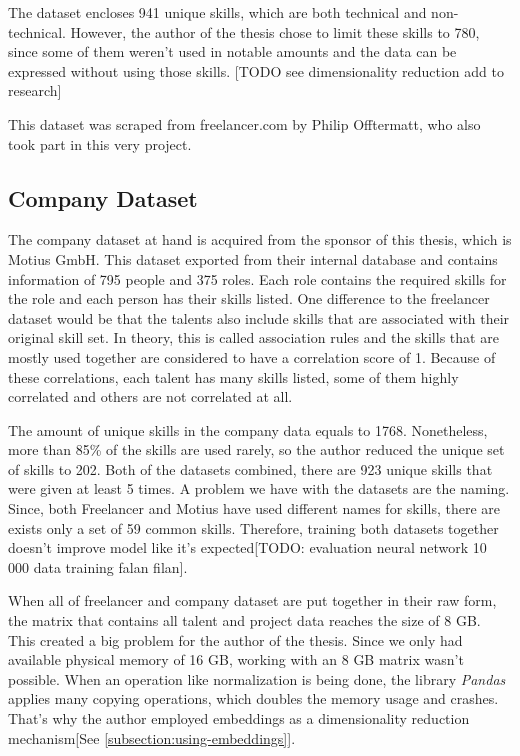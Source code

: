 The dataset encloses  941 unique skills, which are both technical and non-technical. However, the author of the thesis chose to limit these skills to 780, since some of them weren't used in notable amounts and the data can be expressed without using those skills. [TODO see dimensionality reduction add to research]


This dataset was scraped from freelancer.com by Philip Offtermatt, who also took part in this very project.


\subsection{Company Dataset}\label{subsection:company-dataset}

The company dataset at hand is acquired from the sponsor of this thesis, which is Motius GmbH. This dataset exported from their internal database and contains information of 795 people and 375 roles. Each role contains the required skills for the role and each person has their skills listed. One difference to the freelancer dataset would be that the talents also include skills that are associated with their original skill set. In theory, this is called association rules and the skills that are mostly used together are considered to have a correlation score of 1. Because of these correlations, each talent has many skills listed, some of them highly correlated and others are not correlated at all.


The amount of unique skills in the company data equals to 1768. Nonetheless, more than 85\% of the skills are used rarely, so the author reduced the unique set of skills to  202. Both of the datasets combined, there are 923 unique skills that were given at least 5 times. A problem we have with the datasets are the naming. Since, both Freelancer and Motius have used different names for skills, there are exists only a set of 59 common skills. Therefore, training both datasets together doesn't improve model like it's expected[TODO: evaluation neural network 10 000 data training falan filan].


When all of freelancer and company dataset are put together in their raw form, the matrix that contains all talent and project data reaches the size of 8 GB. This created a big problem for the author of the thesis. Since we only had available physical memory of 16 GB, working with an 8 GB matrix wasn't possible. When an operation like normalization is being done, the library \textit{Pandas} applies many copying operations, which doubles the memory usage and crashes. That's why the author employed embeddings as a dimensionality reduction mechanism[See \ref{subsection:using-embeddings}].



